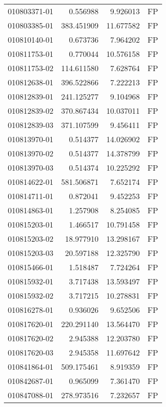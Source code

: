 \begin{tabular}{lrrl}
010803371-01 &    0.556988 &       9.926013 &   FP \\
010803385-01 &  383.451909 &      11.677582 &   FP \\
010810140-01 &    0.673736 &       7.964202 &   FP \\
010811753-01 &    0.770044 &      10.576158 &   FP \\
010811753-02 &  114.611580 &       7.628764 &   FP \\
010812638-01 &  396.522866 &       7.222213 &   FP \\
010812839-01 &  241.125277 &       9.104968 &   FP \\
010812839-02 &  370.867434 &      10.037011 &   FP \\
010812839-03 &  371.107599 &       9.456411 &   FP \\
010813970-01 &    0.514377 &      14.026902 &   FP \\
010813970-02 &    0.514377 &      14.378799 &   FP \\
010813970-03 &    0.514374 &      10.225292 &   FP \\
010814622-01 &  581.506871 &       7.652174 &   FP \\
010814711-01 &    0.872041 &       9.452253 &   FP \\
010814863-01 &    1.257908 &       8.254085 &   FP \\
010815203-01 &    1.466517 &      10.791458 &   FP \\
010815203-02 &   18.977910 &      13.298167 &   FP \\
010815203-03 &   20.597188 &      12.325790 &   FP \\
010815466-01 &    1.518487 &       7.724264 &   FP \\
010815932-01 &    3.717438 &      13.593497 &   FP \\
010815932-02 &    3.717215 &      10.278831 &   FP \\
010816278-01 &    0.936026 &       9.652506 &   FP \\
010817620-01 &  220.291140 &      13.564470 &   FP \\
010817620-02 &    2.945388 &      12.203780 &   FP \\
010817620-03 &    2.945358 &      11.697642 &   FP \\
010841864-01 &  509.175461 &       8.919359 &   FP \\
010842687-01 &    0.965099 &       7.361470 &   FP \\
010847088-01 &  278.973516 &       7.232657 &   FP \\

\end{tabular}
